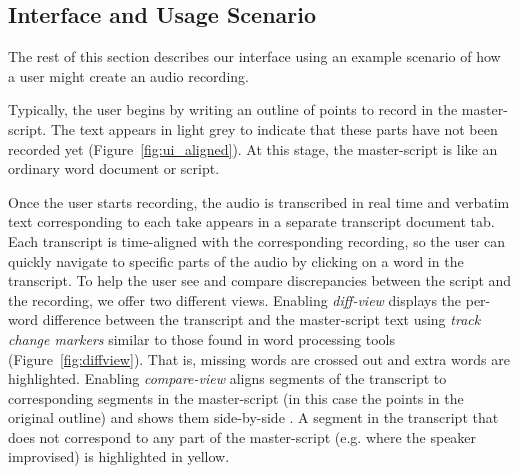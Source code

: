 
\subsection{Interface and Usage Scenario}
The rest of this section describes our interface using an example scenario of how a user might create an audio recording. 

Typically, the user begins by writing an outline of points to record in the master-script.
The text appears in light grey to indicate that these parts have not been recorded yet (Figure~\ref{fig:ui_aligned}). At this stage, the master-script is like an ordinary word document or script. 

Once the user starts recording, the audio is transcribed in real time and verbatim text corresponding to each take appears in a separate transcript document tab. Each transcript is time-aligned with the corresponding recording, so the user can quickly navigate to specific
parts of the audio by clicking on a word in the transcript. To help the user see and compare discrepancies between the script and the recording, we offer two different views.
Enabling \textit{diff-view} displays the per-word difference between the transcript and the master-script text using  \textit{track change markers} similar to those found in word processing tools (Figure~\ref{fig:diffview}). That is, missing words are crossed out and extra words are highlighted. Enabling \textit{compare-view} aligns segments of the transcript to corresponding segments in the master-script (in this case the points in the original outline) and shows them side-by-side . A segment in the transcript that does not correspond to any part of the master-script (e.g. where the speaker improvised) is highlighted in yellow.

